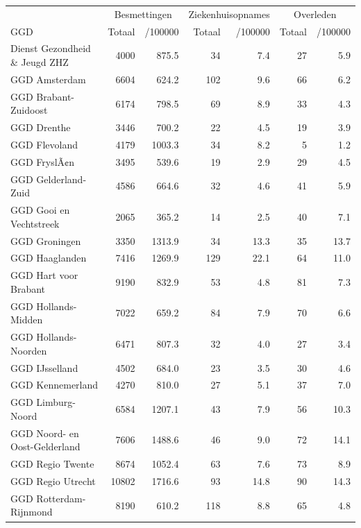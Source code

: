 \documentclass[
  english,
  man,floatsintext]{apa6}
\begin{document}
\begin{table}[H]
\centering\begingroup\fontsize{10}{12}\selectfont

\begin{threeparttable}
\begin{tabular}{lrrrrrr}
\toprule
\multicolumn{1}{c}{ } & \multicolumn{2}{c}{Besmettingen} & \multicolumn{2}{c}{Ziekenhuisopnames} & \multicolumn{2}{c}{Overleden} \\
\cmidrule(l{3pt}r{3pt}){2-3} \cmidrule(l{3pt}r{3pt}){4-5} \cmidrule(l{3pt}r{3pt}){6-7}
GGD & Totaal & /100000 & Totaal & /100000 & Totaal & /100000\\
\midrule
Dienst Gezondheid \& Jeugd ZHZ & 4000 & 875.5 & 34 & 7.4 & 27 & 5.9\\
GGD Amsterdam & 6604 & 624.2 & 102 & 9.6 & 66 & 6.2\\
GGD Brabant-Zuidoost & 6174 & 798.5 & 69 & 8.9 & 33 & 4.3\\
GGD Drenthe & 3446 & 700.2 & 22 & 4.5 & 19 & 3.9\\
GGD Flevoland & 4179 & 1003.3 & 34 & 8.2 & 5 & 1.2\\
GGD FryslÃ¢n & 3495 & 539.6 & 19 & 2.9 & 29 & 4.5\\
GGD Gelderland-Zuid & 4586 & 664.6 & 32 & 4.6 & 41 & 5.9\\
GGD Gooi en Vechtstreek & 2065 & 365.2 & 14 & 2.5 & 40 & 7.1\\
GGD Groningen & 3350 & 1313.9 & 34 & 13.3 & 35 & 13.7\\
GGD Haaglanden & 7416 & 1269.9 & 129 & 22.1 & 64 & 11.0\\
GGD Hart voor Brabant & 9190 & 832.9 & 53 & 4.8 & 81 & 7.3\\
GGD Hollands-Midden & 7022 & 659.2 & 84 & 7.9 & 70 & 6.6\\
GGD Hollands-Noorden & 6471 & 807.3 & 32 & 4.0 & 27 & 3.4\\
GGD IJsselland & 4502 & 684.0 & 23 & 3.5 & 30 & 4.6\\
GGD Kennemerland & 4270 & 810.0 & 27 & 5.1 & 37 & 7.0\\
GGD Limburg-Noord & 6584 & 1207.1 & 43 & 7.9 & 56 & 10.3\\
GGD Noord- en Oost-Gelderland & 7606 & 1488.6 & 46 & 9.0 & 72 & 14.1\\
GGD Regio Twente & 8674 & 1052.4 & 63 & 7.6 & 73 & 8.9\\
GGD Regio Utrecht & 10802 & 1716.6 & 93 & 14.8 & 90 & 14.3\\
GGD Rotterdam-Rijnmond & 8190 & 610.2 & 118 & 8.8 & 65 & 4.8\\

\end{tabular}
\end{threeparttable}
\end{table}
\end{document}
